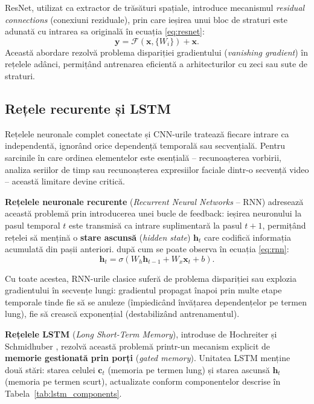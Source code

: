 ResNet, utilizat ca extractor de trăsături spațiale, introduce mecanismul \textit{residual connections} (conexiuni reziduale), prin care ieșirea unui bloc de straturi este adunată cu intrarea sa originală în ecuația \eqref{eq:resnet}:
\begin{equation}
	\label{eq:resnet}
	\mathbf{y} = \mathcal{F}(\mathbf{x}, \{W_i\}) + \mathbf{x}.
\end{equation}
Această abordare rezolvă problema dispariției gradientului (\textit{vanishing gradient}) în rețelele adânci, permițând antrenarea eficientă a arhitecturilor cu zeci sau sute de straturi.

\subsection*{Rețele recurente și LSTM}
Rețelele neuronale complet conectate și CNN-urile tratează fiecare intrare ca independentă, ignorând orice dependență temporală sau secvențială. Pentru sarcinile în care ordinea elementelor este esențială -- recunoașterea vorbirii, analiza seriilor de timp sau recunoașterea expresiilor faciale dintr-o secvență video -- această limitare devine critică.

\textbf{Rețelele neuronale recurente} (\textit{Recurrent Neural Networks} -- RNN) adresează această problemă prin introducerea unei bucle de feedback: ieșirea neuronului la pasul temporal $t$ este transmisă ca intrare suplimentară la pasul $t+1$, permițând rețelei să mențină o \textbf{stare ascunsă} (\textit{hidden state}) $\mathbf{h}_t$ care codifică informația acumulată din pașii anteriori. după cum se poate observa în ecuația \eqref{eq:rnn}:
\begin{equation}
	\label{eq:rnn}
	\mathbf{h}_t = \sigma\left(W_h \mathbf{h}_{t-1} + W_x \mathbf{x}_t + b\right).
\end{equation}

Cu toate acestea, RNN-urile clasice suferă de problema dispariției sau explozia gradientului în secvențe lungi: gradientul propagat înapoi prin multe etape temporale tinde fie să se anuleze (împiedicând învățarea dependențelor pe termen lung), fie să crească exponențial (destabilizând antrenamentul).

\textbf{Rețelele LSTM} (\textit{Long Short-Term Memory}), introduse de Hochreiter și Schmidhuber \cite{hochreiter1997}, rezolvă această problemă printr-un mecanism explicit de \textbf{memorie gestionată prin porți} (\textit{gated memory}). Unitatea LSTM menține două stări: starea celulei $\mathbf{c}_t$ (memoria pe termen lung) și starea ascunsă $\mathbf{h}_t$ (memoria pe termen scurt), actualizate conform componentelor descrise în Tabela~\ref{tab:lstm_components}.

